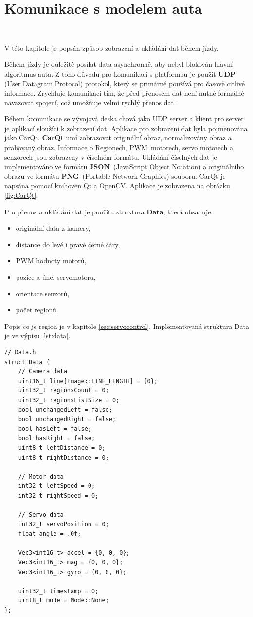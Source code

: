 \chapter{Komunikace s modelem auta}
\label{sec:PlatformCommunication}
\

V této kapitole je popsán způsob zobrazení a ukládání dat během jízdy.

Během jízdy je důležité posílat data asynchronně, aby nebyl blokován hlavní
algoritmus auta. Z toho důvodu pro komunikaci s platformou je použit \textbf{UDP}
(User Datagram Protocol) protokol, který se primárně používá pro časově citlivé
informace. Zrychluje komunikaci tím, že před přenosem dat není nutné formálně
navazovat spojení, což umožňuje velmi rychlý přenos dat \cite{UDP}.

Během komunikace se vývojová deska chová jako UDP server a klient pro server je
aplikací sloužící k zobrazení dat. Aplikace pro zobrazení dat byla pojmenována jako
CarQt. \textbf{CarQt} umí zobrazovat originální obraz, normalizovány obraz a
prahovaný obraz. Informace o Regionech, PWM~motorech, servo motorech a senzorech
jsou zobrazeny v číselném formátu. Ukládání číselných dat je implementováno ve
formátu \textbf{JSON}~(JavaScript Object Notation) a originálního obrazu ve formátu
\textbf{PNG}~(Portable Network Graphics) souboru. CarQt je napsána pomocí knihoven
Qt a OpenCV. Aplikace je zobrazena na obrázku \ref{fig:CarQt}.

Pro přenos a ukládání dat je použita struktura \textbf{Data}, která obsahuje:
\begin{itemize}
    \item originální data z kamery,
    \item distance do levé i pravé černé čáry,
    \item PWM hodnoty motorů,
    \item pozice a úhel servomotoru,
    \item orientace senzorů,
    \item počet regionů.
\end{itemize}
Popis co je region je v kapitole \ref{sec:servocontrol}.
Implementovaná struktura Data je ve výpisu \ref{lst:data}.
\begin{lstlisting}[caption = Struktura Data, label = lst:data]
// Data.h
struct Data {
    // Camera data
    uint16_t line[Image::LINE_LENGTH] = {0};
    uint32_t regionsCount = 0;
    uint32_t regionsListSize = 0;
    bool unchangedLeft = false;
    bool unchangedRight = false;
    bool hasLeft = false;
    bool hasRight = false;
    uint8_t leftDistance = 0;
    uint8_t rightDistance = 0;

    // Motor data
    int32_t leftSpeed = 0;
    int32_t rightSpeed = 0;

    // Servo data
    int32_t servoPosition = 0;
    float angle = .0f;

    Vec3<int16_t> accel = {0, 0, 0};
    Vec3<int16_t> mag = {0, 0, 0};
    Vec3<int16_t> gyro = {0, 0, 0};

    uint32_t timestamp = 0;
    uint8_t mode = Mode::None;
};
\end{lstlisting}


